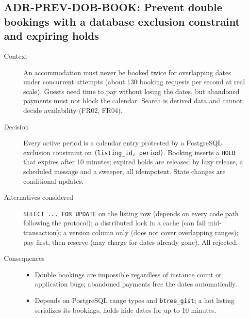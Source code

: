 \subsection{ADR-PREV-DOB-BOOK: Prevent double bookings with a database exclusion constraint and expiring holds}
\begin{description}
  \item[Context]
  An accommodation must never be booked twice for overlapping dates under
  concurrent attempts (about 130 booking requests per second at real scale).
  Guests need time to pay without losing the dates, but abandoned payments must
  not block the calendar. Search is derived data and cannot decide
  availability (FR02, FR04).
  \item[Decision]
  Every active period is a calendar entry protected by a PostgreSQL exclusion
  constraint on \texttt{(listing\_id, period)}. Booking inserts a \texttt{HOLD}
  that expires after 10 minutes; expired holds are released by lazy release, a
  scheduled message and a sweeper, all idempotent. State changes are
  conditional updates.
  \item[Alternatives considered]
  \texttt{SELECT ... FOR UPDATE} on the listing row (depends on every code path
  following the protocol); a distributed lock in a cache (can fail
  mid-transaction); a version column only (does not cover overlapping ranges);
  pay first, then reserve (may charge for dates already gone). All rejected.
  \item[Consequences]
  \begin{itemize}
    \item[+] Double bookings are impossible regardless of instance count or
      application bugs; abandoned payments free the dates automatically.
    \item[$-$] Depends on PostgreSQL range types and \texttt{btree\_gist}; a
      hot listing serializes its bookings; holds hide dates for up to 10
      minutes.
  \end{itemize}
\end{description}

